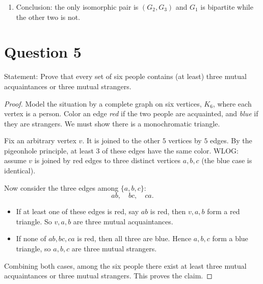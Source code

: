 \documentclass[11pt]{article}
\begin{document}
\begin{enumerate}
\begin{enumerate}
In $G_2$ trace the $10$-cycle obtained by following the outer pentagon vertices together with the
next-layer vertices between them; label this cycle $u_0,u_1,\dots,u_9$ in order. Each $u_i$ has exactly
one remaining neighbor deeper inside; label it $v_i$. The inner edges then connect each $v_i$ to the
two vertices two steps away around the inner structure, giving edges $v_i v_{i\pm 2}$. Thus $G_2$ has
exactly the same adjacency pattern as $H$, so $G_2\cong H$.
\item Since $G_2\cong H$ and $G_3\cong H$, we have $G_2\cong G_3$.
\end{enumerate}

\item Conclusion: the only isomorphic pair is $(G_2,G_3)$ and $G_1$ is bipartite while the other two is not.

\end{enumerate}
\newpage

\section*{Question 5}

Statement: Prove that every set of six people contains (at least) three mutual acquaintances or three mutual strangers.

\medskip

\begin{proof}
Model the situation by a complete graph on six vertices, $K_6$, where each vertex is a person.
Color an edge \emph{red} if the two people are acquainted, and \emph{blue} if they are strangers.
We must show there is a monochromatic triangle.

Fix an arbitrary vertex $v$. It is joined to the other $5$ vertices by $5$ edges. By the pigeonhole
principle, at least $3$ of these edges have the same color. WLOG: assume
$v$ is joined by red edges to three distinct vertices $a,b,c$ (the blue case is identical).

Now consider the three edges among $\{a,b,c\}$:
\[
ab,\quad bc,\quad ca.
\]
\begin{itemize}
\item If at least one of these edges is red, say $ab$ is red, then $v,a,b$ form a red triangle.
So $v,a,b$ are three mutual acquaintances.
\item If none of $ab,bc,ca$ is red, then all three are blue. Hence $a,b,c$ form a blue triangle,
so $a,b,c$ are three mutual strangers.
\end{itemize}

Combining both cases, among the six people there exist at least three mutual acquaintances or three mutual
strangers. This proves the claim.
\end{proof}
\end{document}
